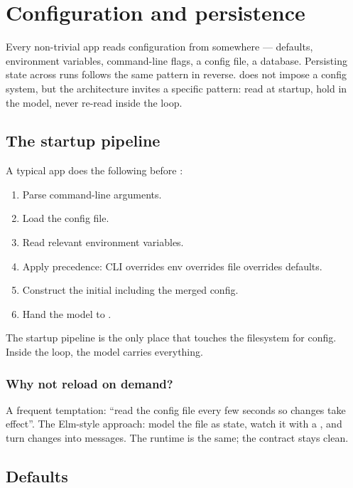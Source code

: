 \chapter{Configuration and persistence}
\label{ch:config}

\begin{aside}
Every non-trivial app reads configuration from somewhere ---
defaults, environment variables, command-line flags, a config
file, a database. Persisting state across runs follows the same
pattern in reverse. \maya{} does not impose a config system, but
the architecture invites a specific pattern: read at startup,
hold in the model, never re-read inside the loop.
\end{aside}

\section{The startup pipeline}

A typical \maya{} app does the following before :

\begin{enumerate}[leftmargin=*]
  \item Parse command-line arguments.
  \item Load the config file.
  \item Read relevant environment variables.
  \item Apply precedence: CLI overrides env overrides file
    overrides defaults.
  \item Construct the initial  including the merged
    config.
  \item Hand the model to .
\end{enumerate}

The startup pipeline is the only place that touches the
filesystem for config. Inside the loop, the model carries
everything.

\subsection*{Why not reload on demand?}

A frequent temptation: ``read the config file every few seconds
so changes take effect''. The Elm-style approach: model the
file as state, watch it with a , and turn
changes into messages. The runtime is the same; the contract
stays clean.

\section{Defaults}


